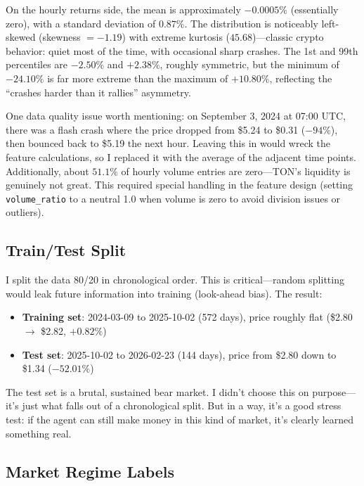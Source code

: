 \documentclass[11pt,a4paper]{article}
\begin{document}
On the hourly returns side, the mean is approximately $-0.0005\%$ (essentially zero), with a standard deviation of $0.87\%$. The distribution is noticeably left-skewed (skewness $= -1.19$) with extreme kurtosis ($45.68$)---classic crypto behavior: quiet most of the time, with occasional sharp crashes. The 1st and 99th percentiles are $-2.50\%$ and $+2.38\%$, roughly symmetric, but the minimum of $-24.10\%$ is far more extreme than the maximum of $+10.80\%$, reflecting the ``crashes harder than it rallies'' asymmetry.

One data quality issue worth mentioning: on September 3, 2024 at 07:00 UTC, there was a flash crash where the price dropped from \$5.24 to \$0.31 ($-94\%$), then bounced back to \$5.19 the next hour. Leaving this in would wreck the feature calculations, so I replaced it with the average of the adjacent time points. Additionally, about $51.1\%$ of hourly volume entries are zero---TON's liquidity is genuinely not great. This required special handling in the feature design (setting \texttt{volume\_ratio} to a neutral 1.0 when volume is zero to avoid division issues or outliers).

\subsection{Train/Test Split}

I split the data 80/20 in chronological order. This is critical---random splitting would leak future information into training (look-ahead bias). The result:

\begin{itemize}[nosep]
    \item \textbf{Training set}: 2024-03-09 to 2025-10-02 (572 days), price roughly flat (\$2.80 $\to$ \$2.82, $+0.82\%$)
    \item \textbf{Test set}: 2025-10-02 to 2026-02-23 (144 days), price from \$2.80 down to \$1.34 ($\mathbf{-52.01\%}$)
\end{itemize}

The test set is a brutal, sustained bear market. I didn't choose this on purpose---it's just what falls out of a chronological split. But in a way, it's a good stress test: if the agent can still make money in this kind of market, it's clearly learned something real.

\subsection{Market Regime Labels}
\end{document}
